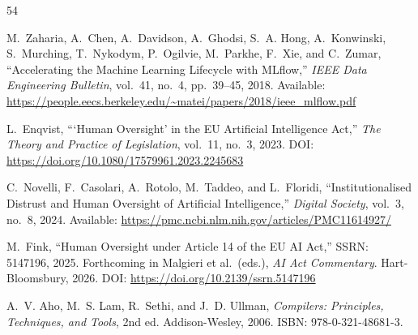 \documentclass[acmlarge,nonacm,screen]{acmart}
\begin{document}
\begin{thebibliography}{54}

M.~Zaharia, A.~Chen, A.~Davidson, A.~Ghodsi, S.~A. Hong, A.~Konwinski, S.~Murching, T.~Nykodym, P.~Ogilvie, M.~Parkhe, F.~Xie, and C.~Zumar,
``Accelerating the Machine Learning Lifecycle with MLflow,''
\textit{IEEE Data Engineering Bulletin}, vol.~41, no.~4, pp.~39--45, 2018.
\newline Available: \url{https://people.eecs.berkeley.edu/~matei/papers/2018/ieee_mlflow.pdf}


L.~Enqvist,
```Human Oversight' in the EU Artificial Intelligence Act,''
\textit{The Theory and Practice of Legislation}, vol.~11, no.~3, 2023.
\newline DOI: \url{https://doi.org/10.1080/17579961.2023.2245683}

C.~Novelli, F.~Casolari, A.~Rotolo, M.~Taddeo, and L.~Floridi,
``Institutionalised Distrust and Human Oversight of Artificial Intelligence,''
\textit{Digital Society}, vol.~3, no.~8, 2024.
\newline Available: \url{https://pmc.ncbi.nlm.nih.gov/articles/PMC11614927/}

M.~Fink,
``Human Oversight under Article 14 of the EU AI Act,''
SSRN: 5147196, 2025. Forthcoming in Malgieri et al.\ (eds.), \textit{AI Act Commentary}. Hart-Bloomsbury, 2026.
\newline DOI: \url{https://doi.org/10.2139/ssrn.5147196}


A.~V. Aho, M.~S. Lam, R.~Sethi, and J.~D. Ullman,
\textit{Compilers: Principles, Techniques, and Tools}, 2nd ed.
Addison-Wesley, 2006. ISBN: 978-0-321-48681-3.


\end{thebibliography}
\end{document}

